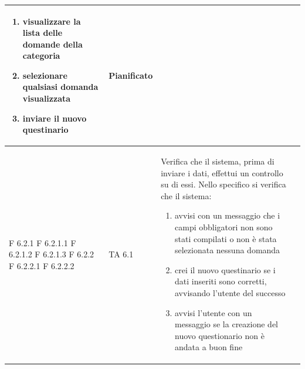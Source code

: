 \documentclass[a4paper,11pt]{article}
\begin{document}
\begin{longtable}{p{}p{}p{}p{}}
\begin{enumerate}
\item visualizzare la lista delle domande della categoria
\item selezionare qualsiasi domanda visualizzata
\item inviare il nuovo questinario
\end{enumerate} & Pianificato\\
\midrule
F 6.2.1 \newline F 6.2.1.1 \newline F 6.2.1.2 \newline F 6.2.1.3 \newline F 6.2.2 \newline F 6.2.2.1 \newline F 6.2.2.2 &  TA 6.1 &Verifica che il sistema, prima di inviare i dati, effettui un controllo su di essi. Nello specifico si verifica che il sistema: 
\begin{enumerate}
\item avvisi con un messaggio che i campi obbligatori non sono stati compilati o non è stata selezionata nessuna domanda
\item crei il nuovo questinario se i dati inseriti sono corretti, avvisando l'utente del successo
\item avvisi l'utente con un messaggio se la creazione del nuovo questionario non è andata a buon fine


\end{enumerate}
\end{longtable}
\end{document}
